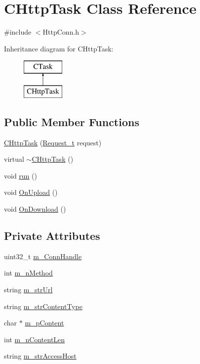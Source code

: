 \hypertarget{class_c_http_task}{}\section{C\+Http\+Task Class Reference}
\label{class_c_http_task}


{\ttfamily \#include $<$Http\+Conn.\+h$>$}

Inheritance diagram for C\+Http\+Task\+:\begin{figure}[H]
\begin{center}
\leavevmode
\includegraphics[height=2.000000cm]{class_c_http_task}
\end{center}
\end{figure}
\subsection*{Public Member Functions}
\begin{DoxyCompactItemize}
\item 
\hyperlink{class_c_http_task_afa21db0ea3592c73cb0c2fa5873f9e2f}{C\+Http\+Task} (\hyperlink{struct_request__t}{Request\+\_\+t} request)
\item 
virtual \hyperlink{class_c_http_task_a19db636729218c1df1e925ec8dd1e059}{$\sim$\+C\+Http\+Task} ()
\item 
void \hyperlink{class_c_http_task_aa339fcf33e48bd15c35dded2ac998dde}{run} ()
\item 
void \hyperlink{class_c_http_task_ae74e46472cff30cc324f920a3a199b31}{On\+Upload} ()
\item 
void \hyperlink{class_c_http_task_afc34e8b0abc31a4fbf6d2813feaaebb3}{On\+Download} ()
\end{DoxyCompactItemize}
\subsection*{Private Attributes}
\begin{DoxyCompactItemize}
\item 
uint32\+\_\+t \hyperlink{class_c_http_task_a57b48cdb901d06007968e1d345d5d061}{m\+\_\+\+Conn\+Handle}
\item 
int \hyperlink{class_c_http_task_a16819f2eccaceae6f1f7a34e6a91be0f}{m\+\_\+n\+Method}
\item 
string \hyperlink{class_c_http_task_a188765b439a847ec4987285f834d922c}{m\+\_\+str\+Url}
\item 
string \hyperlink{class_c_http_task_a2859d827c1868fd41b6bacc07c223b70}{m\+\_\+str\+Content\+Type}
\item 
char $\ast$ \hyperlink{class_c_http_task_af7292840058d7b68a0c5b42bcfae2af9}{m\+\_\+p\+Content}
\item 
int \hyperlink{class_c_http_task_a2a50a9a6fbee3ad7420ac37303de6be0}{m\+\_\+n\+Content\+Len}
\item 
string \hyperlink{class_c_http_task_a17559281c8a1dab1fe59cecede527b0e}{m\+\_\+str\+Access\+Host}
\end{DoxyCompactItemize}



